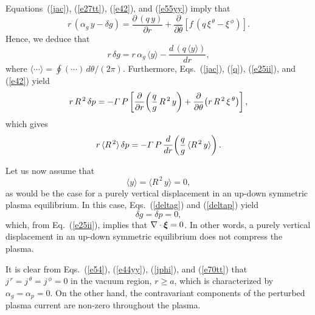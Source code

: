 \documentclass[12pt,prb,aps]{revtex4-1}
\newcommand {\bxi}{\mbox{\boldmath$\xi$}}
\begin{document}
Equations~(\ref{jac}), (\ref{e27tt}), (\ref{e42}), and (\ref{e55yy}) imply that
\begin{equation}
r\,(\alpha_g\,y-\delta g) = \frac{\partial\,(q\,y)}{\partial r} + \frac{\partial}{\partial\theta}\!\left[f\,(q\,\xi^{\,\theta}-\xi^{\,\phi})\right].
\end{equation}
Hence, we deduce that
\begin{equation}\label{deltag}
r\,\delta g = r\,\alpha_g\,\langle y\rangle - \frac{d\,(q\,\langle y\rangle)}{dr},
\end{equation}
where $\langle \cdots\rangle = \oint(\cdots)\,d\theta/(2\pi)$. Furthermore, Eqs.~(\ref{jac}), (\ref{q}), (\ref{e25ii}), and (\ref{e42})   yield\,\cite{tj}
\begin{equation}
r\,R^{\,2}\,\delta p = - {\mit\Gamma}\,P\left[\frac{\partial}{\partial r}\!\left(\frac{q}{g}\,R^{\,2}\,y\right)+\frac{\partial}{\partial\theta}\!\left(r\,R^{\,2}\,\xi^{\,\theta}\right)\right],
\end{equation}
which gives
\begin{equation}\label{deltap}
r\,\langle R^{\,2}\rangle\,\delta p = -{\mit\Gamma}\,P\,\frac{d}{dr}\!\left(\frac{q}{g}\,\langle R^{\,2}\,y\rangle\right).
\end{equation}

Let us now assume that 
\begin{equation}\label{sym}
\langle y\rangle = \langle R^{\,2}\,y\rangle = 0,
\end{equation}
as would be the case for a purely vertical displacement in an up-down symmetric plasma equilibrium.\cite{f1}
In this case, Eqs.~(\ref{deltag}) and (\ref{deltap}) yield 
\begin{equation}\label{e70tt}
\delta g = \delta p = 0,
\end{equation}
 which, from Eq.~(\ref{e25ii}),  implies that $\nabla\cdot\bxi=0$. In other words, a purely vertical displacement in an up-down
symmetric equilibrium does not compress the plasma. 

It is clear from Eqs.~(\ref{e54}), (\ref{e44yy}), (\ref{jphi}), and (\ref{e70tt}) that $j^{\,r}=j^{\,\theta}=j^{\,\phi}=0$ in the vacuum region, $r\geq a$, which is characterized by $\alpha_g=\alpha_p=0$. On the
other hand, the contravariant components of the perturbed plasma current are  non-zero throughout the plasma. 
\end{document}
